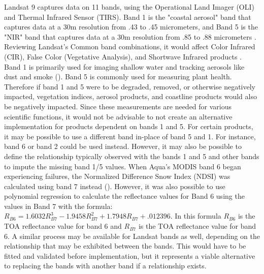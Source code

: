 \documentclass[12pt, letterpaper]{article}
\begin{document}
\begin{enumerate}
    Landsat 9 captures data on 11 bands, using the Operational Land Imager (OLI) and Thermal Infrared Sensor (TIRS). Band 1 is the "coastal aerosol" band that captures data at a 30m resolution from .43 to .45 micrometers, and Band 5 is the "NIR" band that captures data at a 30m resolution from .85 to .88 micrometers \cite{landsat_9}. Reviewing Landsat's Common band combinations, it would affect Color Infrared (CIR), False Color (Vegetative Analysis), and Shortwave Infrared products \cite{landsat_9_band_combos}. Band 1 is primarily used for imaging shallow water and tracking aerosols like dust and smoke (\cite{nasa_landsat_bands}). Band 5 is commonly used for measuring plant health. Therefore if band 1 and 5 were to be degraded, removed, or otherwise negatively impacted, vegetation indices, aerosol products, and coastline products would also be negatively impacted. Since these measurements are needed for various scientific functions, it would not be advisable to not create an alternative implementation for products dependent on bands 1 and 5. For certain products, it may be possible to use a different band in-place of band 5 and 1. For instance, band 6 or band 2 could be used instead. However, it may also be possible to define the relationship typically observed with the bands 1 and 5 and other bands to impute the missing band 1/5 values. When Aqua's MODIS band 6 began experiencing failures, the Normalized Difference Snow Index (NDSI) was calculated using band 7 instead (\cite{modis_band_6}). However, it was also possible to use polynomial regression to calculate the reflectance values for Band 6 using the values in Band 7 with the formula: $R_{B6} = 1.6032R_{B7}^3 - 1.9458R_{B7}^2 + 1.7948R_{B7} + .012396$. In this formula $R_{B6}$ is the TOA reflectance value for band 6 and $R_{B7}$ is the TOA reflectance value for band 6. A similar process may be available for Landsat bands as well, depending on the relationship that may be exhibited between the bands. This would have to be fitted and validated before implementation, but it represents a viable alternative to replacing the bands with another band if a relationship exists.

\end{enumerate}
\pagebreak


\end{document}
